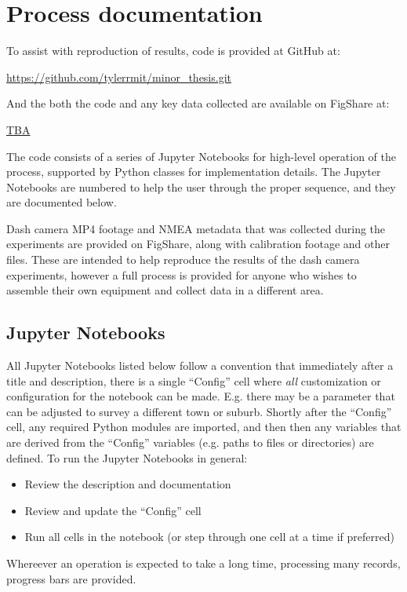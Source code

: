 \documentclass[11pt,twoside]{report}
\begin{document}
\chapter{Process documentation}
\label{a:process}

To assist with reproduction of results, code is provided at GitHub at:

\url{https://github.com/tylerrmit/minor_thesis.git}

And the both the code and any key data collected are available on FigShare at:

\url{TBA}

The code consists of a series of Jupyter Notebooks for high-level operation of the process, supported by Python classes for implementation details.  The Jupyter Notebooks are numbered to help the user through the proper sequence, and they are documented below.

Dash camera MP4 footage and NMEA metadata that was collected during the experiments are provided on FigShare, along with calibration footage and other files.  These are intended to help reproduce the results of the dash camera experiments, however a full process is provided for anyone who wishes to assemble their own equipment and collect data in a different area.

\section{Jupyter Notebooks}
\label{aj}

All Jupyter Notebooks listed below follow a convention that immediately after a title and description, there is a single ``Config'' cell where \textit{all} customization or configuration for the notebook can be made.  E.g. there may be a parameter that can be adjusted to survey a different town or suburb.  Shortly after the ``Config'' cell, any required Python modules are imported, and then then any variables that are derived from the ``Config'' variables (e.g. paths to files or directories) are defined.  To run the Jupyter Notebooks in general:

\begin{itemize}
\item{Review the description and documentation}
\item{Review and update the ``Config'' cell}
\item{Run all cells in the notebook (or step through one cell at a time if preferred)}	
\end{itemize}
Whereever an operation is expected to take a long time, processing many records, progress bars are provided.
\end{document}
